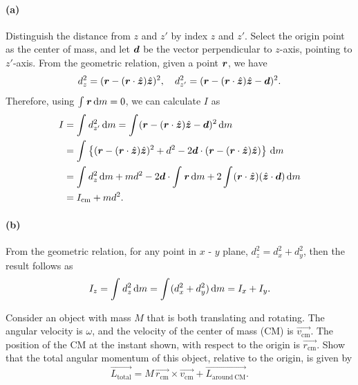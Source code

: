 \documentclass{article}
\begin{document}
\begin{solution}
	\paragraph{(a)} Distinguish the distance from $z$ and $z'$ by index $z$ and $z'$. Select the origin point as the center of mass, and let $\boldsymbol{d}$ be the vector perpendicular to $z$-axis, pointing to $z'$-axis. From the geometric relation, given a point $\boldsymbol{r}$, we have
	\[ d_{z}^2 = (\boldsymbol{r} - (\boldsymbol{r} \cdot \hat{\boldsymbol{z}})\hat{\boldsymbol{z}})^2, \quad 
	d_{z'}^2 = (\boldsymbol{r} - (\boldsymbol{r} \cdot \hat{\boldsymbol{z}})\hat{\boldsymbol{z}} - \boldsymbol{d})^2. \]
	Therefore, using $\int_{}^{}\boldsymbol{r}\,\mathrm{d} m = 0$, we can calculate $I$ as
	\begin{align*}
		I
		&= \int_{}^{}d_{z'}^2 \,\mathrm{d} m 
		= \int_{}^{}(\boldsymbol{r} - (\boldsymbol{r} \cdot \hat{\boldsymbol{z}})\hat{\boldsymbol{z}} - \boldsymbol{d})^2\,\mathrm{d} m \\
		&= \int_{}^{} \left\{ (\boldsymbol{r} - (\boldsymbol{r} \cdot \hat{\boldsymbol{z}})\hat{\boldsymbol{z}})^2 + d^2 - 2 \boldsymbol{d} \cdot (\boldsymbol{r} - (\boldsymbol{r} \cdot \hat{\boldsymbol{z}})\hat{\boldsymbol{z}}) \right\} \,\mathrm{d} m \\
		&= \int_{}^{}d_{z}^2 \,\mathrm{d} m + md^2 - 2 \boldsymbol{d} \cdot \int_{}^{}\boldsymbol{r} \,\mathrm{d} m + 2\int_{}^{}(\boldsymbol{r} \cdot \hat{\boldsymbol{z}}) (\hat{\boldsymbol{z}} \cdot \boldsymbol{d}) \,\mathrm{d} m \\
		&= I_{\mathrm{cm}} + md^2.
	\end{align*}

	\paragraph{(b)} From the geometric relation, for any point in $x$ - $y$ plane, $d_z^2 = d_x^2 + d_y^2$, then the result follows as
	\[ I_z = \int_{}^{}d_z^2 \,\mathrm{d} m = \int_{}^{} (d_x^2 + d_y^2) \,\mathrm{d} m = I_x + I_y. \]
\end{solution}



\begin{problem}
Consider an object with mass $M$ that is both translating and rotating. The angular velocity is $\omega$, and the velocity of the center of mass (CM) is $\overrightarrow{v_{\mathrm{cm}}}$. The position of the CM at the instant shown, with respect to the origin is $\overrightarrow{r_{\mathrm{cm}}}$. Show that the total angular momentum of this object, relative to the origin, is given by
\[
  \overrightarrow{L_{\mathrm{total}}}=M\,\overrightarrow{r_{\mathrm{cm}}}\times\overrightarrow{v_{\mathrm{cm}}}+\overrightarrow{L_{\mathrm{around\ CM}}}.
\]
\end{problem}
\end{document}
